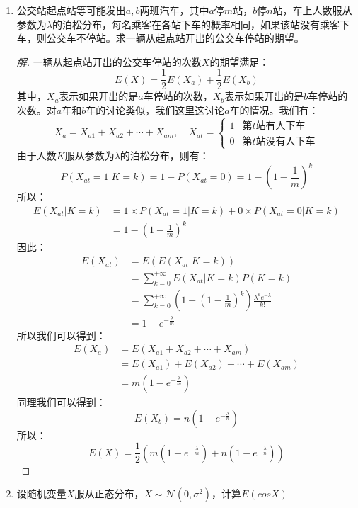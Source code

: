 \documentclass[12pt]{article}
\newcommand{\hei}{\CJKfamily{hei}}                          %
\begin{document}
\begin{enumerate}
\item {\hei 公交站起点站等可能发出$a,b$两班汽车，其中$a$停$m$站，$b$停$n$站，车上人数服从参数为$\lambda$的泊松分布，每名乘客在各站下车的概率相同，如果该站没有乘客下车，则公交车不停站。求一辆从起点站开出的公交车停站的期望。}
\begin{proof}[解]
	一辆从起点站开出的公交车停站的次数$X$的期望满足：
	\begin{equation}
	E(X)=\frac{1}{2}E(X_a)+\frac{1}{2}E(X_b)
	\end{equation}
	其中，$X_a$表示如果开出的是$a$车停站的次数，$X_b$表示如果开出的是$b$车停站的次数。对$a$车和$b$车的讨论类似，我们这里这讨论$a$车的情况。我们有：
	\begin{equation}
	X_a=X_{a1}+X_{a2}+\cdots+X_{am},\quad X_{at}=\left\{
	\begin{array}{cc}
	1 & \mbox{第$t$站有人下车}\\
	0 & \mbox{第$t$站没有人下车}
	\end{array}
	\right.
	\end{equation}
	由于人数$K$服从参数为$\lambda$的泊松分布，则有：
	\begin{equation}
	P(X_{at}=1|K=k)=1-P(X_{at}=0)=1-\left(1-\frac{1}{m}\right)^k
	\end{equation}
	所以：
	\begin{equation}
	\begin{aligned}
	E(X_{at}|K=k)&=1\times P(X_{at}=1|K=k)+0\times P(X_{at}=0|K=k) \\
	&=1-\left(1-\frac{1}{m}\right)^k
	\end{aligned}
	\end{equation}
	因此：
	\begin{equation}
	\begin{aligned}
	E(X_{at})&=E(E(X_{at}|K=k)) \\
	&=\sum_{k=0}^{+\infty}E(X_{at}|K=k)P(K=k) \\
	&=\sum_{k=0}^{+\infty}\left(1-\left(1-\frac{1}{m}\right)^k\right)\frac{\lambda^ke^{-\lambda}}{k!} \\
	&=1-e^{-\frac{\lambda}{m}}
	\end{aligned}
	\end{equation}
	所以我们可以得到：
	\begin{equation}
	\begin{aligned}
	E(X_a)&=E(X_{a1}+X_{a2}+\cdots+X_{am}) \\
	&=E(X_{a1})+E(X_{a2})+\cdots+E(X_{am}) \\
	&=m\left(1-e^{-\frac{\lambda}{m}}\right)
	\end{aligned}
	\end{equation}
	同理我们可以得到：
	\begin{equation}
	E(X_b)=n\left(1-e^{-\frac{\lambda}{n}}\right)
	\end{equation}
	所以：
	\begin{equation}
	E(X)=\frac{1}{2}\left(m\left(1-e^{-\frac{\lambda}{m}}\right)+n\left(1-e^{-\frac{\lambda}{n}}\right)\right)
	\end{equation}
\end{proof}

\item {\hei 设随机变量$X$服从正态分布，$X\sim \mathcal{N}(0,\sigma^2)$，计算$E(cos X)$}
\end{enumerate}
\end{document}
